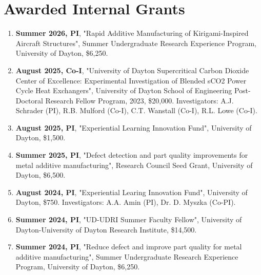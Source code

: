 \documentclass[11pt, letterpaper]{article}
\begin{document}
    \section{Awarded Internal Grants}
    \begin{enumerate}[label=\arabic*., itemsep=-1pt, topsep=2pt]
        \item \textbf{Summer 2026, PI}, "Rapid Additive Manufacturing of Kirigami-Inspired Aircraft Structures", Summer Undergraduate Research Experience Program, University of Dayton, \$6,250.
        \item \textbf{August 2025, Co-I}, "University of Dayton Supercritical Carbon Dioxide Center of Excellence: Experimental Investigation of Blended sCO2 Power Cycle Heat Exchangers", University of Dayton School of Engineering Post-Doctoral Research Fellow Program, 2023, \$20,000. Investigators: A.J. Schrader (PI), R.B. Mulford (Co-I), C.T. Wanstall (Co-I), R.L. Lowe (Co-I).
        \item \textbf{August 2025, PI}, "Experiential Learning Innovation Fund", University of Dayton, \$1,500.
        \item \textbf{Summer 2025, PI}, "Defect detection and part quality improvements for metal additive manufacturing", Research Council Seed Grant, University of Dayton, \$6,500.
        \item \textbf{August 2024, PI}, "Experiential Learing Innovation Fund", University of Dayton, \$750. Investigators: A.A. Amin (PI), Dr. D. Myszka (Co-PI).
        \item \textbf{Summer 2024, PI}, "UD-UDRI Summer Faculty Fellow", University of Dayton-University of Dayton Research Institute, \$14,500.
        \item \textbf{Summer 2024, PI}, "Reduce defect and improve part quality for metal additive manufacturing", Summer Undergraduate Research Experience Program, University of Dayton, \$6,250.
    \end{enumerate}
\end{document}
